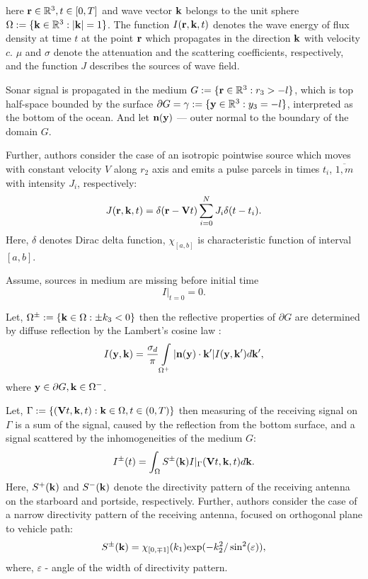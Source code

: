 \documentclass{procDDs}
\begin{document}
here $\mathbf{r} \in \mathbb{R}^3, t \in [0, T]$ and wave vector $\mathbf{k}$ belongs to the unit sphere $\Omega := \{\mathbf{k} \in \mathbb{R}^3: |\mathbf{k}| = 1\}$. The function $I(\mathbf{r},\mathbf{k}, t)$ denotes the wave energy of flux density at time $t$  at the point $\mathbf{r}$ which propagates in the direction $\mathbf{k}$  with velocity $c$. $\mu$ and $\sigma$ denote the attenuation and the scattering coefficients, respectively, and the function $J$ describes the sources of wave field.

Sonar signal is propagated in the medium $G:=\{\mathbf{r} \in \mathbb{R}^3:r_3 > -l\}$, which is top half-space bounded by the surface $\partial G = \gamma := \{\mathbf{y} \in \mathbb{R}^3: y_3 = -l \}$, interpreted as the bottom of the ocean. And let $\textbf{n}(\mathbf{y})$ --- outer normal to the boundary of the domain $G$. 

Further, authors consider the case of an isotropic pointwise source which moves with constant velocity $V$ along $r_2$ axis and emits a pulse parcels in times $t_i$, $\overline{1,m}$ with intensity $J_i$, respectively: 
\begin{equation}
\label{source}
J(\mathbf{r},\mathbf{k}, t) = \delta(\mathbf{r} - \mathbf{V} t)\sum\limits_{i=0}^{N} J_i \delta(t-t_i).
\end{equation}
Here, $\delta$ denotes Dirac delta function, $\chi_{[a,b]}$ is characteristic function of interval $[a,b]$.

Assume, sources in medium are missing before initial time
\begin{equation}
\label{init_cond}
I\rvert_{t=0}=0.
\end{equation}

Let, $\Omega^\pm := \{\mathbf{k} \in \Omega: \pm k_3 < 0\}$ then the reflective properties of $\partial G$  are determined by diffuse reflection by the Lambert’s cosine law \cite{SPIE_KOV, Prokh_Sush_Kim_2017}:
\begin{equation}
\label{boundary_condition}
I(\mathbf{y},\mathbf{k}) = \frac{\sigma_d}{\pi} \int\limits_{\Omega ^+}|\mathbf{n}(\mathbf{y})\cdot \mathbf{k}'| I(\mathbf{y},\mathbf{k}') d\mathbf{k}' ,
\end{equation}
where  $\mathbf{y} \in \partial G, \mathbf{k} \in \Omega^-$.


Let, $\Gamma := \{ (\mathbf{V}t, \mathbf{k}, t): \mathbf{k} \in \Omega, t \in (0,T) \}$  then measuring of the receiving signal on $\Gamma$ is a sum of the signal, caused by the reflection from the bottom surface, and a signal scattered by the inhomogeneities of the medium $G$:
\begin{multline}
	\label{sum_sig}
	I^\pm(t) = \int_{\Omega} S^\pm(\mathbf{k}) I|_{\Gamma}(\mathbf{V}t, \mathbf{k}, t)d\mathbf{k}.
\end{multline}
Here, $S^+(\mathbf{k})$ and $S^-(\mathbf{k})$ denote the directivity pattern of the receiving antenna on the starboard and portside, respectively. Further, authors consider the case of a narrow directivity pattern of the receiving antenna, focused on orthogonal plane to vehicle path:
\begin{equation}
\label{diagram}
S^\pm(\mathbf{k}) = \chi_{[0,\mp1]}(k_1)  \text{exp}(-k_2^2/\sin^2(\varepsilon)),
\end{equation}
where, $\varepsilon $ - angle of the width of directivity pattern.
\end{document}
